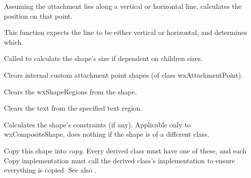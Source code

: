 Assuming the attachment lies along a vertical or horizontal line,
calculates the position on that point.








This function expects the line to be either vertical or horizontal, and determines which.



Called to calculate the shape's size if dependent on children sizes.



Clears internal custom attachment point shapes (of class wxAttachmentPoint).



Clears the wxShapeRegions from the shape.



Clears the text from the specified text region.



Calculates the shape's constraints (if any). Applicable
only to wxCompositeShape, does nothing if the shape is of
a different class.

\label{wxshapecopy}


Copy this shape into {\it copy}. Every derived class must have one of these, and each Copy implementation
must call the derived class's implementation to ensure everything is copied. See also .

